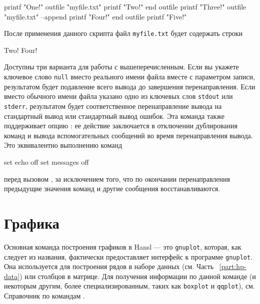 \begin{code}
  printf "One!\n"
  outfile "myfile.txt"
    printf "Two!\n"
  end outfile
  printf "Three!\n"
  outfile "myfile.txt" --append
    printf "Four!\n"
  end outfile
  printf "Five!\n"
\end{code}
После применения данного скрипта файл \texttt{myfile.txt} будет
содержать строки
\begin{code}
Two!
Four!  
\end{code}
Доступны три варианта для работы с вышеперечисленным. Если вы укажете
ключевое слово \texttt{null} вместо реального имени файла вместе с
параметром записи, результатом будет подавление всего вывода до
завершения перенаправления. Если вместо обычного имени файла указано
одно из ключевых слов \texttt{stdout} или \texttt{stderr}, результатом
будет соответственное перенаправление вывода на стандартный вывод или
стандартный вывод ошибок. Эта команда также поддерживает опцию
: ее действие заключается в отключении дублирования
команд и вывода вспомогательных сообщений во время перенаправления
вывода. Это эквивалентно выполнению команд

\begin{code}
  set echo off 
  set messages off
\end{code}
перед вызовом , за исключением того, что по окончании
перенаправления предыдущие значения команд и другие сообщения
восстанавливаются.

\section{Графика}

Основная команда построения графиков в Hansl --- это \texttt{gnuplot},
которая, как следует из названия, фактически предоставляет интерфейс к
программе \texttt{gnuplot}. Она используется для построения рядов в
наборе данных (см. Часть ~\ref{part:hp-data}) или столбцов в
матрице. Для получения информации по данной команде (и некоторым
другим, более специализированным, таких как \texttt{boxplot} и
\texttt{qqplot}), см. Справочник по командам \GCR.

